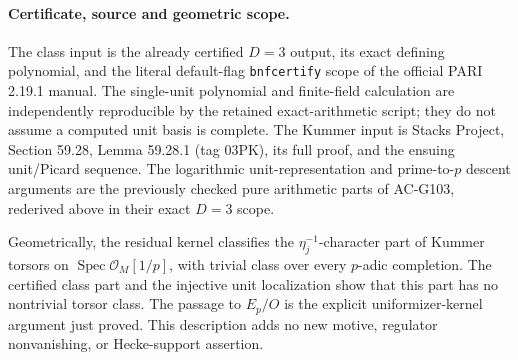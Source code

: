 \paragraph{Certificate, source and geometric scope.}
The class input is the already certified $D=3$ output, its exact
defining polynomial, and the literal default-flag
\texttt{bnfcertify} scope of the official PARI 2.19.1 manual.
The single-unit polynomial and finite-field calculation are
independently reproducible by the retained exact-arithmetic script;
they do not assume a computed unit basis is complete.
The Kummer input is Stacks Project, Section 59.28, Lemma 59.28.1
(tag 03PK), its full proof, and the ensuing unit/Picard sequence.
The logarithmic unit-representation and prime-to-$p$ descent
arguments are the previously checked pure arithmetic parts of
AC-G103, rederived above in their exact $D=3$ scope.

Geometrically, the residual kernel classifies the
$\eta_j^{-1}$-character part of Kummer torsors on
$\operatorname{Spec}\mathcal O_M[1/p]$, with trivial class over
every $p$-adic completion.  The certified class part and the
injective unit localization show that this part has no nontrivial
torsor class.  The passage to $E_p/O$ is the explicit
uniformizer-kernel argument just proved.  This description adds
no new motive, regulator nonvanishing, or Hecke-support assertion.
